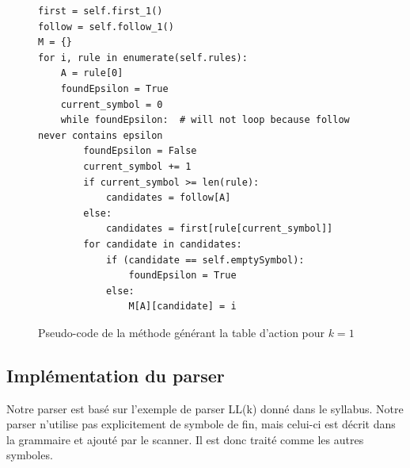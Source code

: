\documentclass[a4paper,10pt]{article}
\begin{document}
\begin{figure}[H]
\begin{lstlisting}
first = self.first_1()
follow = self.follow_1()
M = {}
for i, rule in enumerate(self.rules):
	A = rule[0]
	foundEpsilon = True
	current_symbol = 0
	while foundEpsilon:  # will not loop because follow never contains epsilon
		foundEpsilon = False
		current_symbol += 1
		if current_symbol >= len(rule):
			candidates = follow[A]
		else:
			candidates = first[rule[current_symbol]]
		for candidate in candidates:
			if (candidate == self.emptySymbol):
				foundEpsilon = True
			else:
				M[A][candidate] = i
\end{lstlisting}
\fontfamily{}
\caption{Pseudo-code de la méthode générant la table d'action pour $k = 1$}
\label{lst:actionTable}
\end{figure}

\subsection{Implémentation du parser}

\label{anx:parserImpl}

Notre parser est basé sur l'exemple de parser LL(k) donné dans le syllabus. Notre parser n'utilise pas explicitement de symbole de fin, mais celui-ci est décrit dans la grammaire et ajouté par le scanner. Il est donc traité comme les autres symboles.
\end{document}
